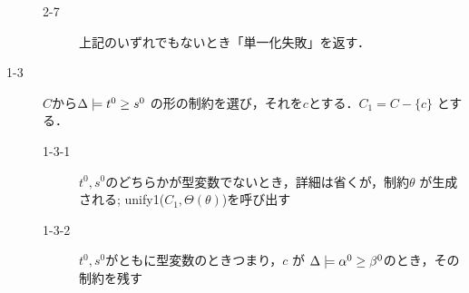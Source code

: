 \begin{oframed}
\begin{description}
\begin{description}
    \item[2-7] 上記のいずれでもないとき「単一化失敗」を返す．
    \end{description}
  \item[1-3] $C$から$\Delta \models {t^0} \ge {s^0}$ の形の制約を選び，それを$c$とする．$C_1 = C - \{c\}$ とする．
    \begin{description}
    \item[1-3-1] $t^0,s^0$のどちらかが型変数でないとき，詳細は省くが，制約$\theta$ が生成される;
      unify1($C_1, \Theta(\theta)$)を呼び出す
    \item[1-3-2] $t^0,s^0$がともに型変数のときつまり，$c$ が $\Delta \models {\alpha^0} \ge {\beta^0}$のとき，その制約を残す
    \end{description}
  \end{description}
\end{oframed}




